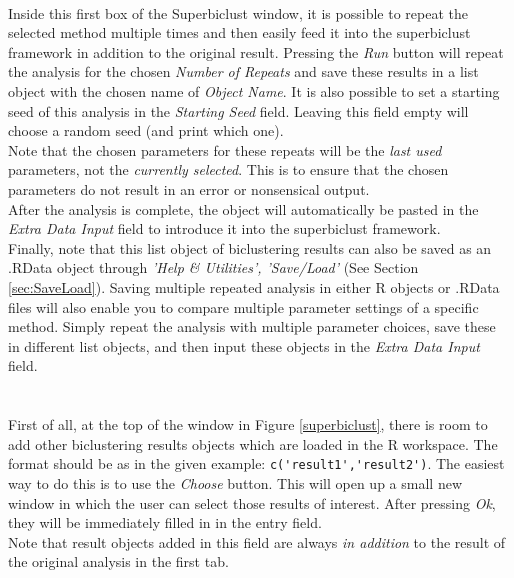 \documentclass[a4paper]{article}\usepackage[]{graphicx}\usepackage[]{color}
\begin{document}
\\
Inside this first box of the Superbiclust window, it is possible to repeat the
selected method multiple times and then easily feed it into the superbiclust
framework in addition to the original result. Pressing the {\it Run} button will
repeat the analysis for the chosen {\it Number of Repeats} and save these
results in a list object with the chosen name of {\it Object Name}. It is also possible to set a starting seed of
this analysis in the {\it Starting Seed} field. Leaving this field empty will
choose a random seed (and print which one).\\
Note that the chosen parameters for these repeats will be the {\it last used}
parameters, not the {\it currently selected}. This is to ensure that the chosen
parameters do not result in an error or nonsensical output.\\
After the analysis is complete, the object will automatically be pasted in the
{\it Extra Data Input} field to introduce it into the superbiclust framework.\\
Finally, note that this list object of biclustering results can also be saved as
an .RData object through {\it 'Help \& Utilities', 'Save/Load'} (See Section
\ref{sec:SaveLoad}). Saving multiple repeated analysis in either R objects or
.RData files will also enable you to compare multiple parameter settings of a
specific method. Simply repeat the analysis with multiple parameter choices,
save these in different list objects, and then input these objects in the {\it
Extra Data Input} field.
\\ \\
\\
\noindent First of all, at the top of the window in Figure \ref{superbiclust},
there is room to add other biclustering results objects which are loaded in the
R workspace. The format should be as in the given example:
\verb|c('result1','result2')|. The easiest way to do this is to use the {\it
Choose} button. This will open up a small new window in which the user can
select those results of interest. After pressing {\it Ok}, they will be
immediately filled in in the entry field.\\
Note that result objects added in this field are always {\it in addition} to the
result of the original analysis in the first tab.
\\ \\
\\
\end{document}
